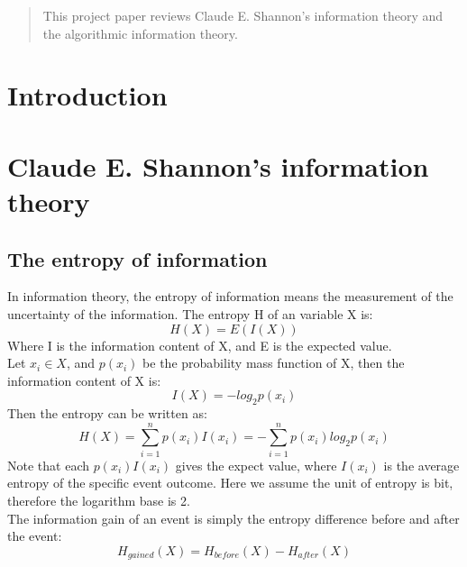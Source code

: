 \documentclass[12pt]{article}
\begin{document}
\maketitle

\begin{abstract}
This project paper reviews Claude E. Shannon's information theory and the algorithmic information theory.
\end{abstract}

\section{Introduction}

\section{Claude E. Shannon's information theory}

\subsection{The entropy of information}
In information theory, the entropy of information means the measurement of the uncertainty of the information. The entropy H of an variable X is:
\[
	H(X) = E(I(X))
\]
Where I is the information content of X, and E is the expected value.\\
Let $x_i \in X$, and $p(x_i)$ be the probability mass function of X, then the information content of X is:
\[
	I(X) = -log_{2}p(x_i)
\]
Then the entropy can be written as\cite{reza94}:
\[
	H(X) = \sum_{i=1}^{n}p(x_i)I(x_i) = -\sum_{i=1}^{n}p(x_i)log_{2}p(x_i)
\]
Note that each $p(x_i)I(x_i)$ gives the expect value, where $I(x_i)$ is the average entropy of the specific event outcome. Here we assume the unit of entropy is bit, therefore the logarithm base is 2.\\

The information gain of an event is simply the entropy difference before and after the event:
\[
	H_{gained}(X) = H_{before}(X) - H_{after}(X)
\]
\end{document}
